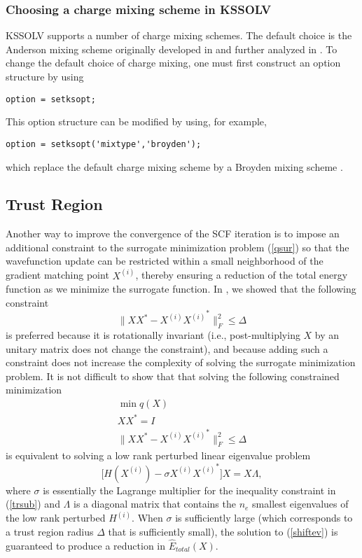 \documentclass[11pt]{book}
\newcommand{\exi} {X^{(i)}}
\newcommand{\Hi} {H^{(i)}}
\newcommand{\hEtot}{\hat{E}_{total}}
\begin{document}
\subsubsection{Choosing a charge mixing scheme in KSSOLV}

KSSOLV supports a number of charge mixing schemes. The default choice
is the Anderson mixing scheme originally developed in \cite{anderson}
and further analyzed in \cite{eyert,fangsaad}.  To change the default choice of 
charge mixing, one must first construct an option structure by
using
\begin{verbatim}
option = setksopt;
\end{verbatim}
This option structure can be modified by using, for example,
\begin{verbatim}
option = setksopt('mixtype','broyden');
\end{verbatim}
which replace the default charge mixing scheme by a Broyden mixing
scheme \cite{luke}.


\subsection{Trust Region}
Another way to improve the convergence of the SCF iteration is to impose an additional constraint to
the surrogate minimization problem (\ref{qsur}) so that the wavefunction
update can be restricted within a small neighborhood of the gradient matching
point $\exi$, thereby ensuring a reduction of the total energy function as we 
minimize the surrogate function.
In \cite{trdcm}, we showed that the following constraint
\[
\| XX^{\ast} - \exi {\exi}^{\ast} \|_F^2 \leq \Delta
\]
is preferred because it is rotationally invariant (i.e., post-multiplying $X$
by an unitary matrix does not change the constraint), and because adding
such a constraint does not increase the complexity of solving the surrogate 
minimization problem.  It is not difficult to show \cite{trdcm} that that solving the
following constrained minimization 
\begin{equation}
\begin{array}{c}
\min q(X) \\
XX^{\ast} = I \\
\| XX^{\ast} - \exi {\exi}^{\ast} \|_F^2 \leq \Delta
\end{array}
\label{trsub}
\end{equation}
is equivalent to solving a low rank perturbed linear eigenvalue problem
\begin{equation}
\biggl[H(\exi) - \sigma \exi {\exi}^{\ast}\biggr] X = X \Lambda, 
\label{shiftev}
\end{equation}
where $\sigma$ is essentially the Lagrange multiplier for the inequality constraint
in (\ref{trsub}) and $\Lambda$ is a diagonal matrix that contains the $n_e$
smallest eigenvalues of the low rank perturbed $\Hi$.
When $\sigma$ is sufficiently large (which corresponds to a trust region
radius $\Delta$ that is sufficiently small), the solution to (\ref{shiftev})
is guaranteed to produce a reduction in $\hEtot(X)$.
\end{document}
